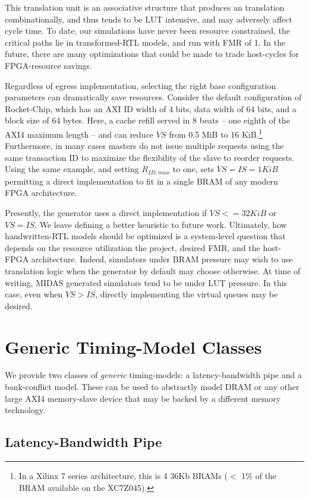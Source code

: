 This translation unit is an associative structure that produces an translation
combinationally, and thus tends to be LUT intensive, and may adversely affect
cycle time. To date, our simulations have never been resource constrained, the
critical paths lie in transformed-RTL models, and run with FMR of 1. In the
future, there are many optimizations that could be made to trade host-cycles for
FPGA-resource savings.

Regardless of egress implementation, selecting the right base configuration
parameters can dramatically save resources. Consider the default configuration
of Rocket-Chip, which has an AXI ID width of 4 bits, data width of 64 bits, and
a block size of 64 bytes. Here, a cache refill served in 8 beats -- one eighth
of the AXI4 maximum length -- and can reduce $VS$ from 0.5 MiB to 16
KiB.\footnote{In a Xilinx 7 series architecture, this is 4 36Kb BRAMs ($<$ 1\%
of the BRAM available on the XC7Z045).} Furthermore, in many cases masters do not
issue multiple requests using the same transaction ID to maximize the
flexibility of the slave to reorder requests. Using the same example, and
setting $R_{ID,max}$ to one, sets $VS = IS = 1 KiB$ permitting a direct
implementation to fit in a single BRAM of any modern FPGA architecture.

Presently, the generator uses a direct implementation if $VS <= 32 KiB$ or $VS
= IS$. We leave defining a better heuristic to future work. Ultimately, how
handwritten-RTL models should be optimized is a system-level question that
depends on the resource utilization the project, desired FMR, and
the host-FPGA architecture. Indeed, simulators under BRAM pressure may wish to use
translation logic when the generator by default may choose otherwise. At time
of writing, MIDAS generated simulators tend to be under LUT pressure. In this
case, even when $VS > IS$, directly implementing the virtual queues may be
desired.

\section{Generic Timing-Model Classes}

We provide two classes of \emph{generic} timing-models: a latency-bandwidth
pipe and a bank-conflict model. These can be used to abstractly model DRAM or
any other large AXI4 memory-slave device that may be backed by a different
memory technology.

\subsection{Latency-Bandwidth Pipe}

